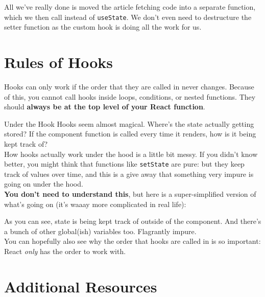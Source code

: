 
All we've really done is moved the article fetching code into a separate function, which we then call instead of \texttt{useState}. We don't even need to destructure the setter function as the custom hook is doing all the work for us.

\section{Rules of Hooks}

Hooks can only work if the order that they are called in never changes. Because of this, you cannot call hooks inside loops, conditions, or nested functions. They should \textbf{always be at the top level of your React function}.

\begin{infobox}{Under the Hook}
    Hooks seem almost magical. Where's the state actually getting stored? If the component function is called every time it renders, how is it being kept track of?
    \\

    How hooks actually work under the hood is a little bit messy. If you didn't know better, you might think that functions like \texttt{setState} are pure: but they keep track of values over time, and this is a give away that something very impure is going on under the hood.
    \\

    \textbf{You don't need to understand this}, but here is a super-simplified version of what's going on (it's waaay more complicated in real life):


    As you can see, state is being kept track of outside of the component. And there's a bunch of other global(ish) variables too. Flagrantly impure.
    \\

    You can hopefully also see why the order that hooks are called in is so important: React \textit{only} has the order to work with.
\end{infobox}


\section{Additional Resources}

